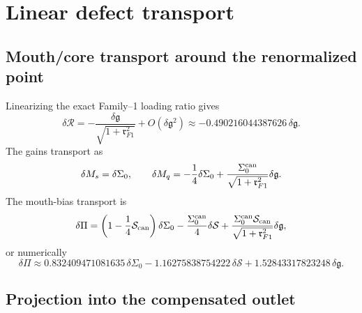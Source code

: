 \section{Linear defect transport}
\label{sec:app-part04_geometry_retarded_mouth:linear-defect-transport}

\subsection{Mouth/core transport around the renormalized point}
\label{subsec:app-part04-linear-mouth-core-transport}

Linearizing the exact Family--1 loading ratio gives
\begin{equation}
\label{eq:app-part04-deltaR-deltag}
\delta\mathcal R
=-\frac{\delta\mathfrak g}{\sqrt{1+\mathfrak r_{F1}^2}}+O(\delta\mathfrak g^2)
\approx -0.490216044387626\,\delta\mathfrak g.
\end{equation}
The gains transport as
\begin{equation}
\label{eq:app-part04-deltaMsMq}
\delta M_s=\delta\Sigma_0,
\qquad
\delta M_q=-\frac14\delta\Sigma_0+\frac{\Sigma_0^{\rm can}}{\sqrt{1+\mathfrak r_{F1}^2}}\delta\mathfrak g.
\end{equation}
The mouth-bias transport is
\begin{equation}
\label{eq:app-part04-deltaPi-transport}
\delta\Pi
=
\left(1-\frac14\mathcal S_{\rm can}\right)\delta\Sigma_0
-\frac{\Sigma_0^{\rm can}}{4}\delta\mathcal S
+
\frac{\Sigma_0^{\rm can}\mathcal S_{\rm can}}{\sqrt{1+\mathfrak r_{F1}^2}}\delta\mathfrak g,
\end{equation}
or numerically
\begin{equation}
\label{eq:app-part04-deltaPi-numeric}
\delta\Pi
\approx
0.832409471081635\,\delta\Sigma_0
-1.16275838754222\,\delta\mathcal S
+1.52843317823248\,\delta\mathfrak g.
\end{equation}

\subsection{Projection into the compensated outlet}
\label{subsec:app-part04-projection-compensated-outlet}

